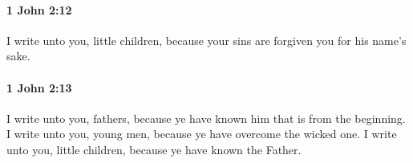 		\paragraph{1 John 2:12} %
			\label{1JOHN-2-12}

			I write unto you, little children, because your sins are forgiven you for his name's sake.

			\begin{framed}
			\scriptsize
				\begin{compactdesc}
					\item[SBLG] 
				\end{compactdesc}
			\end{framed}

		\paragraph{1 John 2:13} %
			\label{1JOHN-2-13}

			I write unto you, fathers, because ye have known him that is from the beginning.  I write unto you, young men, because ye have overcome the wicked one.  I write unto you, little children, because ye have known the Father.


